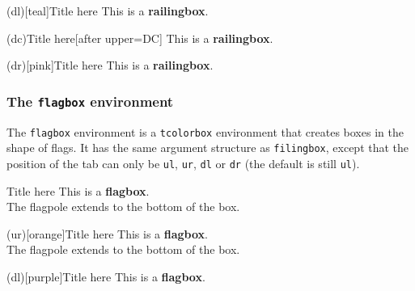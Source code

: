 \documentclass{article}
\begin{document}
{\begin{verbbox}
\begin{railingbox}(dl)[teal]{Title here}
This is a \textbf{railingbox}.
\end{railingbox}
\end{verbbox}

\begin{verbbox}
\begin{railingbox}(dc){Title here}[after upper=DC]
This is a \textbf{railingbox}.
\end{railingbox}
\end{verbbox}

\begin{verbbox}
\begin{railingbox}(dr)[pink]{Title here}
This is a \textbf{railingbox}.
\end{railingbox}
\end{verbbox}

\subsubsection*{The \texttt{flagbox} environment}

The \texttt{flagbox} environment is a \texttt{tcolorbox} environment that creates boxes in the shape of flags. It has the same argument structure as \texttt{filingbox}, except that the position of the tab can only be \texttt{ul}, \texttt{ur}, \texttt{dl} or \texttt{dr} (the default is still \texttt{ul}).

\begin{verbbox}
\begin{flagbox}{Title here}
This is a \textbf{flagbox}.\\

The flagpole extends to the bottom of the box.
\end{flagbox}
\end{verbbox}
\begin{verbbox}
\begin{flagbox}(ur)[orange]{Title here}
This is a \textbf{flagbox}.\\

The flagpole extends to the bottom of the box.
\end{flagbox}
\end{verbbox}
\begin{verbbox}
\begin{flagbox}(dl)[purple]{Title here}
This is a \textbf{flagbox}.\\


\end{flagbox}
\end{verbbox}}
\end{document}
